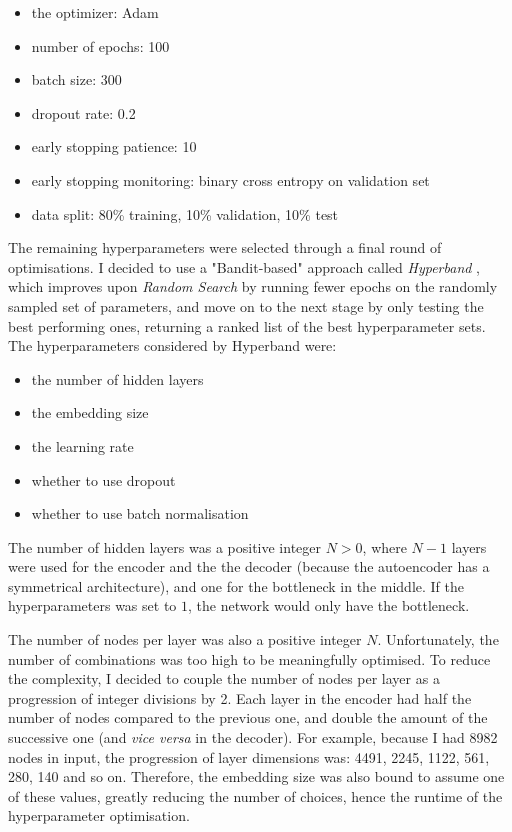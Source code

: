 \begin{itemize}
  \item the optimizer: Adam
  \item number of epochs: 100
  \item batch size: 300
  \item dropout rate: 0.2
  \item early stopping patience: 10
  \item early stopping monitoring: binary cross entropy on validation set
  \item data split: 80\% training, 10\% validation, 10\% test
\end{itemize}

The remaining hyperparameters were selected through a final round of optimisations. I decided to use a "Bandit-based" approach
called \textit{Hyperband} \cite{DBLP:journals/corr/LiJDRT16}, which improves upon \textit{Random Search}
by running fewer epochs on the randomly sampled set of parameters,
and move on to the next stage by only testing the best performing ones, returning a ranked list of the best hyperparameter sets.
The hyperparameters considered by Hyperband were:

\begin{itemize}
  \item the number of hidden layers
  \item the embedding size
  \item the learning rate
  \item whether to use dropout
  \item whether to use batch normalisation
\end{itemize}

The number of hidden layers was a positive integer $N > 0$, where $N-1$ layers were used for the encoder and the
the decoder (because the autoencoder has a symmetrical architecture), and one for the bottleneck in the middle.
If the hyperparameters was set to $1$, the network would only have the bottleneck.

The number of nodes per layer was also a positive integer $N$. Unfortunately, the number of combinations was too high to be
meaningfully optimised. To reduce the complexity, I decided to couple the number of nodes per layer as a progression
of integer divisions by 2.
Each layer in the encoder had half the number of nodes compared to the previous one, and double the amount of the successive one
(and \textit{vice versa} in the decoder). For example, because I had 8982 nodes in input, the progression of layer dimensions
was: 4491, 2245, 1122, 561, 280, 140 and so on. Therefore, the embedding size was also bound to assume one of these values,
greatly reducing the number of choices, hence the runtime of the hyperparameter optimisation.

